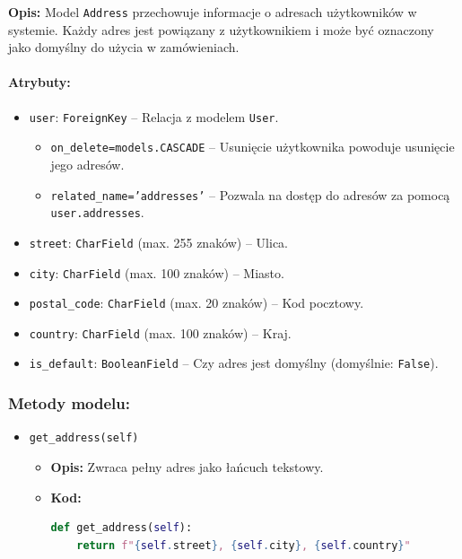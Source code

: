 \documentclass[12pt,a4paper,oneside]{article}
\theoremstyle{definition}
\numberwithin{equation}{section}
\begin{document}
\textbf{Opis:}  
Model \texttt{Address} przechowuje informacje o adresach użytkowników w systemie. Każdy adres jest powiązany z użytkownikiem i może być oznaczony jako domyślny do użycia w zamówieniach.

\paragraph{Atrybuty:}
\begin{itemize}
    \item \texttt{user}: \texttt{ForeignKey} – Relacja z modelem \texttt{User}.
    \begin{itemize}
        \item \texttt{on\_delete=models.CASCADE} –
            \subsubitem Usunięcie użytkownika powoduje usunięcie jego adresów.
        \item \texttt{related\_name='addresses'} – 
            \subsubitem Pozwala na dostęp do adresów za pomocą \texttt{user.addresses}.
    \end{itemize}
    \item \texttt{street}: \texttt{CharField} (max. 255 znaków) – Ulica.
    \item \texttt{city}: \texttt{CharField} (max. 100 znaków) – Miasto.
    \item \texttt{postal\_code}: \texttt{CharField} (max. 20 znaków) – Kod pocztowy.
    \item \texttt{country}: \texttt{CharField} (max. 100 znaków) – Kraj.
    \item \texttt{is\_default}: \texttt{BooleanField} – Czy adres jest domyślny (domyślnie: \texttt{False}).
\end{itemize}

\subsubsection{Metody modelu:}
\begin{itemize}
    \item \texttt{get\_address(self)}  
        \begin{itemize}
            \item \textbf{Opis:} Zwraca pełny adres jako łańcuch tekstowy.
            \item \textbf{Kod:}
            \begin{lstlisting}[language=Python, caption=Metoda \texttt{get\_address}]
def get_address(self):
    return f"{self.street}, {self.city}, {self.country}"
            \end{lstlisting}
        \end{itemize}
\end{itemize}
\end{document}
